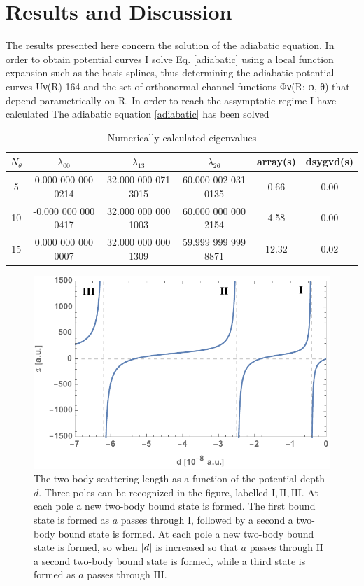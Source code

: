 \chapter{Results and Discussion}
The results presented here concern the solution of the adiabatic equation. In order to obtain potential curves I solve Eq. \eqref{adiabatic} using a local function expansion such as the basis splines, thus determining the adiabatic potential curves Uν(R)
164
and the set of orthonormal channel functions Φν(R; φ, θ) that depend parametrically on R. In order to reach the assymptotic regime 
I have calculated The adiabatic equation \eqref{adiabatic} has been solved 
\begin{table}[h!]
	\centering
	\begin{tabular}{||c c c c c c||} 
		\hline
		$N_{\theta}$ & $\lambda_{0 0}$ & $\lambda_{1 3}$ & $\lambda_{2 6}$ & array(s) & dsygvd(s)
		\\ [0.5ex] 
		\hline\hline
		5	   & 0.000 000 000 0214   & 32.000 000 071 3015 & 60.000 002 031 0135 & 0.66 & 0.00  \\
		10     & -0.000 000 000 0417  & 32.000 000 000 1003 & 60.000 000 000 2154  & 4.58 & 0.00 \\
		15 & 0.000 000 000 0007 & 32.000 000 000 1309 & 59.999 999 999 8871& 12.32& 0.02 \\  [1ex] 
		\hline
	\end{tabular}
	\caption{Numerically calculated eigenvalues}
	\label{table:2}
\end{table}

\begin{figure}
	\includegraphics[width=\linewidth]{scatteringlength.pdf}
	\caption{The two-body scattering length as a function of the potential depth $d$. Three poles can be recognized in the figure, labelled $\mathrm{I},\mathrm{II},\mathrm{III}$. At each pole a new two-body bound state is formed. The first bound state is formed as $a$ passes through $\mathrm{I}$, followed by a second a two-body bound state is formed. At each pole a new two-body bound state is formed, so when $\lvert d\rvert$ is increased so that $a$ passes through $\mathrm{II}$ a second two-body bound state is formed, while a third state is formed as $a$ passes through $\mathrm{III}$.}
	\label{fig:3}
\end{figure}

